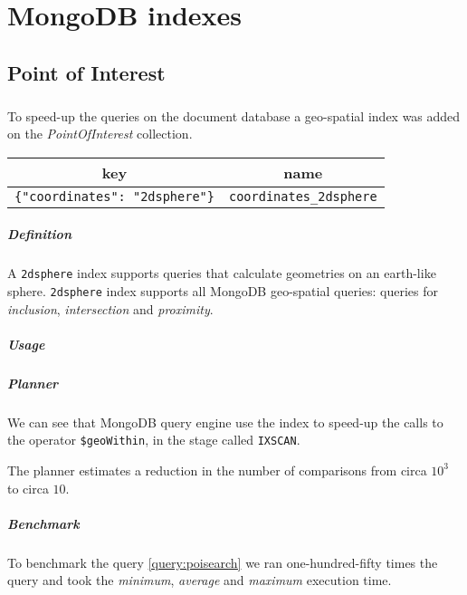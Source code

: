 \chapter{MongoDB indexes}

\section{Point of Interest}

\paragraph{}
To speed-up the queries on the document database a geo-spatial index was added 
on the \textit{PointOfInterest} collection.

\begin{tabular}{|c|c|}
	\hline
	key & name \\
	\hline
	\texttt{\{"coordinates": "2dsphere"\}} & \texttt{coordinates\_2dsphere} 
	\\
	\hline
\end{tabular}

\paragraph{Definition}
A \texttt{2dsphere} index supports queries that calculate geometries on an 
earth-like sphere. \texttt{2dsphere} index supports all MongoDB geo-spatial 
queries: queries for \textit{inclusion}, \textit{intersection} and 
\textit{proximity}.

\paragraph{Usage}

\paragraph{Planner}
We can see that MongoDB query engine use the index to speed-up the calls to the 
operator \texttt{\$geoWithin}, in the stage called \texttt{IXSCAN}.

The planner estimates a reduction in the number of comparisons from circa 
$10^3$ to circa $10$.



\paragraph{Benchmark}
To benchmark the query \ref{query:poisearch} we ran one-hundred-fifty times the 
query 
and took the \textit{minimum}, \textit{average} and \textit{maximum} execution 
time.

